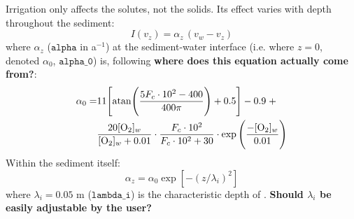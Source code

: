 \documentclass[a4paper]{article}
\newcommand{\code}[1]{\texttt{#1}}
\newcommand{\wtf}[1]{\textcolor{Cerulean}{\textbf{#1}}}
\begin{document}
Irrigation only affects the solutes, not the solids. Its effect varies with depth throughout the sediment:
\begin{equation}
I(v_z) = \alpha_z \, (v_w - v_z)
\end{equation}
where $\alpha_z$ ($\code{alpha}$ in a$^{-1}$) at the sediment-water interface (i.e. where $z = 0$, denoted $\alpha_0$, $\code{alpha\_0}$) is, following \wtf{where does this equation actually come from?}:
\begin{equation}
\begin{split}
\alpha_0 = & 11 \Bigg[ \mathrm{atan} \Bigg( \frac{5 F_c \cdot 10^2 - 400}{400 \pi} \Bigg) + 0.5 \Bigg] - 0.9 \; + \\
& \frac{20 [\ce{O2}]_w}{[\ce{O2}]_w + 0.01} \cdot \frac{F_c \cdot 10^2}{F_c \cdot 10^2 + 30} \cdot \exp \Bigg(\frac{-[\ce{O2}]_w}{0.01}\Bigg)
\end{split}
\end{equation}
Within the sediment itself:
\begin{equation}
\alpha_z = \alpha_0 \exp [-(z/\lambda_i)^2]
\end{equation}
where $\lambda_i = 0.05$ m ($\code{lambda\_i}$) is the characteristic depth of \citet{archer_model_2002}. \wtf{Should $\lambda_i$ be easily adjustable by the user?}


\end{document}
